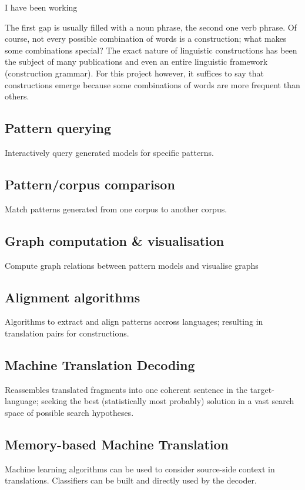 \documentclass[12pt]{article}
\begin{document}
\begin{examples}
\item I have been working
\end{examples}

The first gap is usually filled with a noun phrase, the second one verb phrase. Of course, not every possible combination of words is a construction; what makes some combinations special? The exact nature of linguistic constructions has been the subject of many publications and even an entire linguistic framework (construction grammar). For this project however, it suffices to say that constructions emerge because some combinations of words are more frequent than others.


\subsection{Pattern querying} Interactively query generated models for specific patterns.
\subsection{Pattern/corpus comparison} Match patterns generated from one corpus to another corpus.
\subsection{Graph computation \& visualisation} Compute graph relations between pattern models and visualise graphs
\subsection{Alignment algorithms} Algorithms to extract and align patterns accross languages; resulting in translation pairs for constructions.
\subsection{Machine Translation Decoding} Reassembles translated fragments into one coherent sentence in the target-language; seeking the best (statistically most probably) solution in a vast search space of possible search hypotheses.
\subsection{Memory-based Machine Translation} Machine learning algorithms can be used to consider source-side context in translations. Classifiers can be built and directly used by the decoder.
\end{document}
